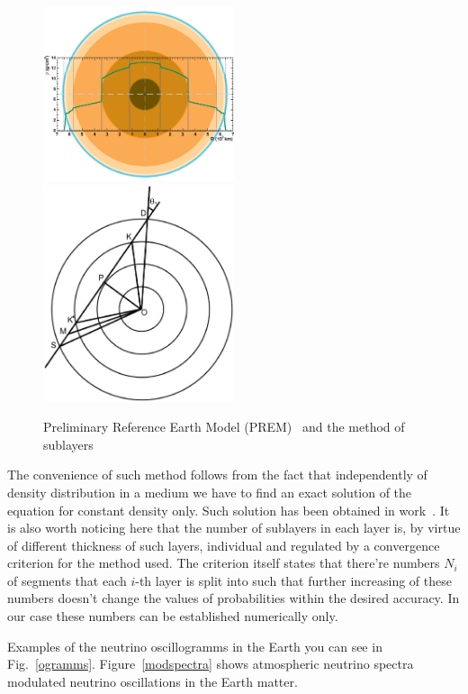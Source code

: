 \begin{figure}[htb!]
\includegraphics[width=0.5\textwidth]{./MSW/Earth_PREM.eps}
\includegraphics[width=0.5\textwidth]{./MSW/Earth_Layers.eps}
\caption{\label{PREM}Preliminary Reference Earth Model (PREM)~\cite{Dziewonski:1981xy} and the method of sublayers}
\end{figure}

The convenience of such method follows from the fact that independently of density distribution in a medium we have to find an exact solution of the equation for constant density only. Such solution has been obtained in work~\cite{Naumov:1991ju,Naumov:1991rh}. It is also worth noticing here that the number of sublayers in each layer is, by virtue of different thickness of such layers, individual and regulated by a convergence criterion for the method used. The criterion itself states that there're numbers ${N_{i}}$ of segments that each $i$-th layer is split into such that further increasing of these numbers doesn't change the values of probabilities within the desired accuracy. In our case these numbers can be established numerically only.

Examples of the neutrino oscillogramms in the Earth you can see in Fig.~\ref{ogramms}. Figure~\ref{modspectra} shows atmospheric neutrino spectra modulated neutrino oscillations in the Earth matter.

